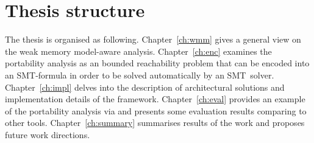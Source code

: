 \section{Thesis structure}
\label{ch:intro:structure}

The thesis is organised as following.
Chapter~\ref{ch:wmm} gives a general view on the weak memory model-aware analysis.
Chapter~\ref{ch:enc} examines the portability analysis as an bounded reachability problem that can be encoded into an SMT-formula in order to be solved automatically by an SMT~solver.
Chapter~\ref{ch:impl} delves into the description of architectural solutions and implementation details of the \porthos[2] framework.
Chapter~\ref{ch:eval} provides an example of the portability analysis via \porthos[2] and presents some evaluation results comparing to other tools. %
Chapter~\ref{ch:summary} summarises results of the work and proposes future work directions. %
